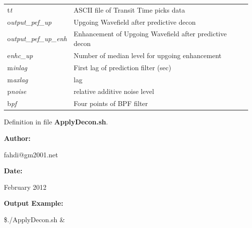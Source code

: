 \documentclass{article}
\begin{document}
\vspace{4pt}
\begin{tabular}{|>{\raggedright}p{54pt}|>{\raggedright}p{245pt}|}
\hline
\tabularnewline
\hline
t\textit{t}  & ASCII file of Transit Time picks data \tabularnewline
\hline
o\textit{utput\_pef\_up}  & Upgoing Wavefield after predictive decon \tabularnewline
\hline
o\textit{utput\_pef\_up\_enh}  & Enhancement of Upgoing Wavefield after predictive 
decon \tabularnewline
\hline
e\textit{nhc\_up}  & Number of median level for upgoing enhancement \tabularnewline
\hline
m\textit{inlag}  & First lag of prediction filter (sec) \tabularnewline
\hline
m\textit{axlag}  & lag \tabularnewline
\hline
p\textit{noise}  & relative additive noise level \tabularnewline
\hline
b\textit{pf}  & Four points of BPF filter \tabularnewline
\hline
\end{tabular}

\vspace{1pt}
Definition in file \textbf{ApplyDecon.sh}.

\vspace{4pt}
\textbf{Author:}

\vspace{4pt}
\leftskip=18pt
fahdi@gm2001.net 

\vspace{4pt}
\leftskip=0pt
\textbf{Date:}

\vspace{4pt}
\leftskip=18pt
February 2012 

\vspace{16pt}
\leftskip=0pt
\textbf{Output Example:}

\vspace{4pt}
\$./ApplyDecon.sh \&
\end{document}
